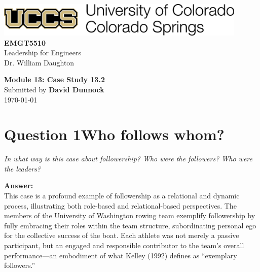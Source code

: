 \documentclass[12pt]{article}
\newenvironment{problem}{\color{dodblue}\itshape}{\par}
\begin{document}
\begin{center}
    \includegraphics[width=0.9\textwidth,keepaspectratio]{assets/images/uccs-logo.png}\\[8\baselineskip]

    {\HeadingFont\fontsize{24}{26}\selectfont\textbf{EMGT5510}}\\[0.25\baselineskip]
    {\large Leadership for Engineers}\\[0.15\baselineskip]
    {\small Dr. William Daughton}\\[2\baselineskip]
\vfill

    {\HeadingFont\fontsize{20}{22}\selectfont\textbf{Module 13: Case Study 13.2}}\\[0.5\baselineskip]
    {Submitted by \textbf{David Dunnock}}\\[0.15\baselineskip]
    {\today}
\end{center}

\newpage

\section*{Question 1\textemdash{}Who follows whom?}
\begin{problem}
In what way is this case about followership? Who were the followers? Who were the leaders?
\end{problem}

\textbf{Answer:}\\
This case is a profound example of followership as a relational and dynamic process, illustrating both role-based and relational-based perspectives. The members of the University of Washington rowing team exemplify followership by fully embracing their roles within the team structure, subordinating personal ego for the collective success of the boat. Each athlete was not merely a passive participant, but an engaged and responsible contributor to the team’s overall performance—an embodiment of what Kelley (1992) defines as “exemplary followers.”
\end{document}
